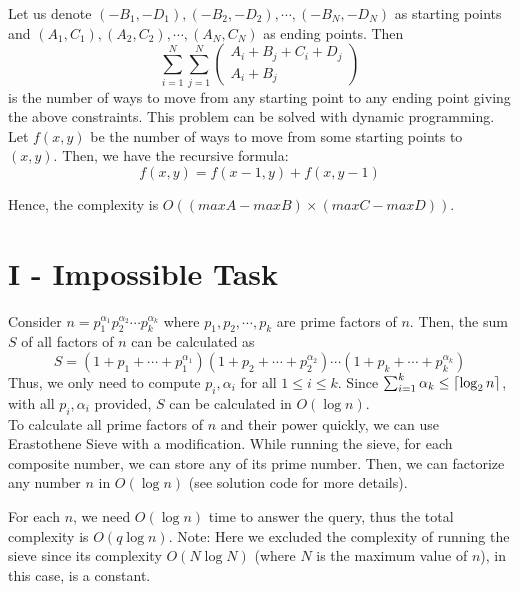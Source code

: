 \documentclass{article}
\DeclarePairedDelimiter\ceil{\lceil}{\rceil}
\begin{document}
\noindent Let us denote $(-B_1, -D_1), (-B_2, -D_2), \cdots, (-B_N, -D_N)$ as starting points and $(A_1, C_1), (A_2, C_2), \cdots, (A_N, C_N)$ as ending points. Then
\begin{equation}
\sum_{i = 1}^N\sum_{j = 1}^N\begin{pmatrix}
A_i + B_j + C_i + D_j\\
A_i + B_j
\end{pmatrix}
\end{equation}
is the number of ways to move from any starting point to any ending point giving the above constraints. This problem can be solved with dynamic programming. Let
$f(x, y)$ be the number of ways to move from some starting points to $(x, y)$. Then, we have the recursive formula:
\begin{equation}
f(x, y) = f(x - 1, y) + f(x, y - 1)
\end{equation}

\noindent Hence, the complexity is $O((maxA - maxB) \times (maxC - maxD))$.

\section*{I - Impossible Task}
Consider $n = p_1^{\alpha_1}p_2^{\alpha_2}\cdots p_k^{\alpha_k}$ where $p_1, p_2, \cdots, p_k$ are prime factors of $n$.
Then, the sum $S$ of all factors of $n$ can be calculated as
\begin{equation}
S = \left(1 + p_1 + \cdots + p_1^{\alpha_1}\right)\left(1 + p_2 + \cdots + p_2^{\alpha_2}\right)\cdots\left(1 + p_k + \cdots + p_k^{\alpha_k}\right)
\end{equation}
Thus, we only need to compute $p_i, \alpha_i$ for all $1 \leq i \leq k$. Since $\sum_{i = 1}^k \alpha_k \leq \ceil{\log_2{n}}$, with
all $p_i, \alpha_i$ provided, $S$ can be calculated in $O(\log{n})$.\\

\noindent To calculate all prime factors of $n$ and their power quickly, we can use Erastothene Sieve with a modification. While
running the sieve, for each composite number, we can store any of its prime number. Then, we can factorize any number $n$ in
$O(\log{n})$ (see solution code for more details).

For each $n$, we need $O(\log{n})$ time to answer the query, thus the total complexity is $O(q\log{n})$. Note: Here we excluded
the complexity of running the sieve since its complexity $O(N\log{N})$ (where $N$ is the maximum value of $n$), in this case, is
a constant.
\end{document}
